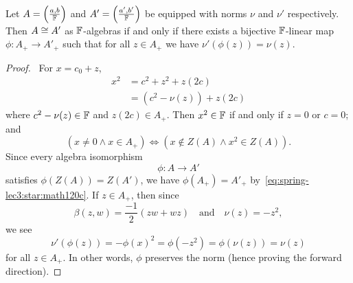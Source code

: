 \begin{lemma}\label{lemma:1.12}
Let $A=\left(\frac{a,b}{\mathbb{F}}\right)$ and $A'=\left(\frac{a',b'}{\mathbb{F}}\right)$
be equipped with norms $\nu$ and $\nu'$ respectively. Then $A\cong A'$
as $\mathbb{F}$-algebras if and only if there exists a bijective $\mathbb{F}$-linear
map $\phi\colon A_{+}\to A'_{+}$ such that for all $z\in A_{+}$ we
have $\nu'(\phi(z))=\nu(z)$.
\end{lemma}

\begin{proof}
\forwardproof\ For $x=c_{0}+z$,
\begin{subequations}
  \begin{align}
x^{2}&=c^{2}+z^{2}+z(2c)\\
&=(c^{2}-\nu(z))+z(2c)
  \end{align}
\end{subequations}
where $c^{2}-\nu(z)\in\mathbb{F}$ and $z(2c)\in A_{+}$.
Then $x^{2}\in\mathbb{F}$ if and only if $z=0$ or $c=0$; and
\begin{equation}\label{eq:spring-lec3:star:math120c}
(x\neq0\land x\in A_{+})\iff(x\notin Z(A)\land x^{2}\in Z(A)).
\end{equation}
Since every algebra isomorphism
\begin{equation}
\phi\colon A\to A'
\end{equation}
satisfies $\phi(Z(A))=Z(A')$, we have $\phi(A_{+})=A'_{+}$ by~\eqref{eq:spring-lec3:star:math120c}.
If $z\in A_{+}$, then since
\begin{equation}
\beta(z,w)=\frac{-1}{2}(zw+wz)\quad\mbox{and}\quad\nu(z)=-z^{2},
\end{equation}
we see
\begin{equation}
\nu'(\phi(z))=-\phi(x)^{2}=\phi(-z^{2})=\phi(\nu(z))=\nu(z)
\end{equation}
for all $z\in A_{+}$.
In other words, $\phi$ preserves the norm (hence proving the forward
direction).


\end{proof}
